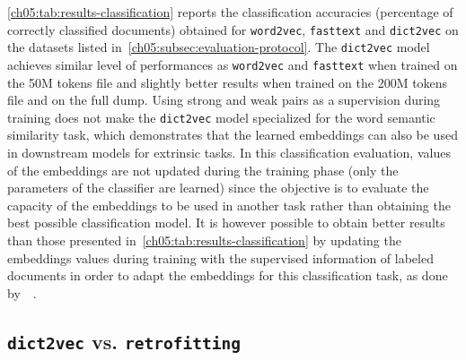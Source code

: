     \autoref{ch05:tab:results-classification} reports the classification
    accuracies (percentage of correctly classified documents) obtained for
    \texttt{word2vec}, \texttt{fasttext} and \texttt{dict2vec} on the datasets
    listed in~\autoref{ch05:subsec:evaluation-protocol}. The \texttt{dict2vec}
    model achieves similar level of performances as \texttt{word2vec} and
    \texttt{fasttext} when trained on the 50M tokens file and slightly better
    results when trained on the 200M tokens file and on the full dump. Using
    strong and weak pairs as a supervision during training does not make the
    \texttt{dict2vec} model specialized for the word semantic similarity task,
    which demonstrates that the learned embeddings can also be used in
    downstream models for extrinsic tasks. In this classification evaluation,
    values of the embeddings are not updated during the training
    phase (only the parameters of the classifier are learned)
    since the objective is to evaluate the capacity of the embeddings to be used
    in another task rather than obtaining the best possible classification
    model. It is however possible to obtain better results than those presented
    in~\autoref{ch05:tab:results-classification} by updating the embeddings
    values during training with the supervised information of labeled documents
    in order to adapt the embeddings for this classification task, as done
    by~\citeauthor{joulin2016bag}~\citep{joulin2016bag}.

  \subsection{\texttt{dict2vec} vs. \texttt{retrofitting}}
    \label{ch05:subsec:dict2vec-vs-retrofitting}

